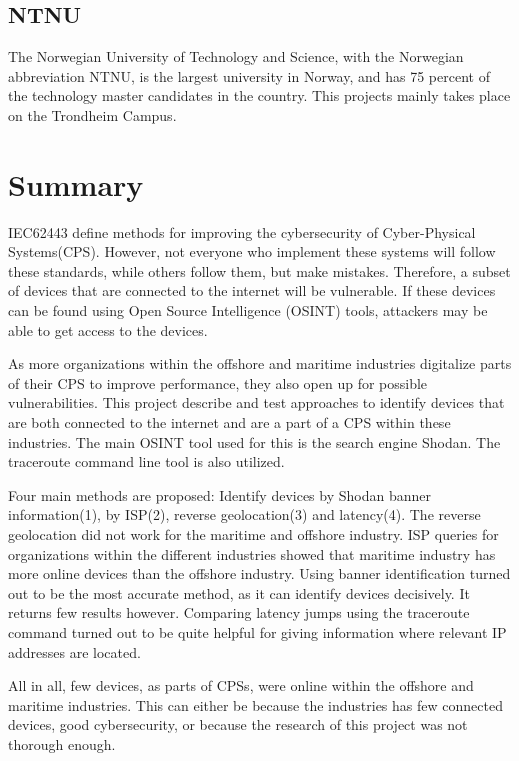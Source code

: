 \subsection*{NTNU}\label{sec:ntnu}
The Norwegian University of Technology and Science, with the Norwegian abbreviation NTNU, is the largest university in Norway, and has 75 percent of the technology master candidates in the country. This projects mainly takes place on the Trondheim Campus.

\section*{Summary}
IEC62443 define methods for improving the cybersecurity of Cyber-Physical Systems(CPS). However, not everyone who implement these systems will follow these standards, while others follow them, but make mistakes. Therefore, a subset of devices that are connected to the internet will be vulnerable. If these devices can be found using Open Source Intelligence (OSINT) tools, attackers may be able to get access to the devices. 

As more organizations within the offshore and maritime industries digitalize parts of their CPS to improve performance, they also open up for possible vulnerabilities. This project describe and test approaches to identify devices that are both connected to the internet and are a part of a CPS within these industries. The main OSINT tool used for this is the search engine Shodan. The traceroute command line tool is also utilized.

Four main methods are proposed: Identify devices by Shodan banner information(1), by ISP(2), reverse geolocation(3) and latency(4).
The reverse geolocation did not work for the maritime and offshore industry. 
ISP queries for organizations within the different industries showed that  maritime industry has more online devices than the offshore industry. 
Using banner identification turned out to be the most accurate method, as it can identify devices decisively. It returns few results however.
Comparing latency jumps using the traceroute command turned out to be quite helpful for giving information where relevant IP addresses are located.

All in all, few devices, as parts of CPSs, were online within the offshore and maritime industries. This can either be because the industries has few connected devices, good cybersecurity, or because the research of this project was not thorough enough.

\newpage
